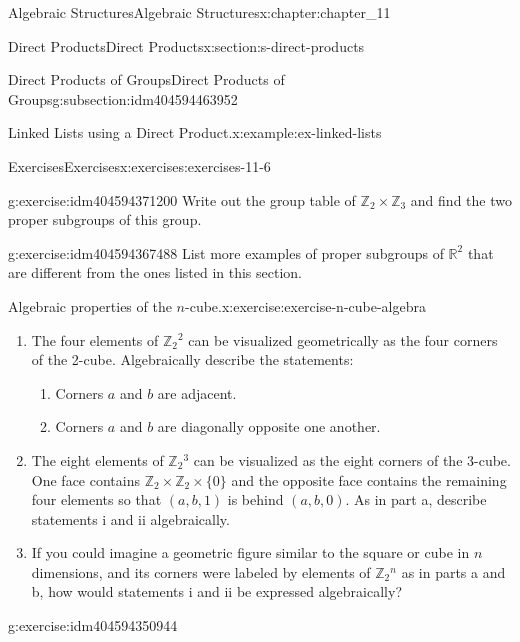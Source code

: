 \documentclass[twoside,10pt,]{book}
\numberwithin{equation}{section}
\begin{document}
\begin{chapterptx}{Algebraic Structures}{}{Algebraic Structures}{}{}{x:chapter:chapter_11}
\begin{sectionptx}{Direct Products}{}{Direct Products}{}{}{x:section:s-direct-products}
\begin{subsectionptx}{Direct Products of Groups}{}{Direct Products of Groups}{}{}{g:subsection:idm404594463952}
\begin{example}{Linked Lists using a Direct Product.}{x:example:ex-linked-lists}
\end{example}
\end{subsectionptx}
%
%
\typeout{************************************************}
\typeout{************************************************}
%
\begin{exercises-subsection}{Exercises}{}{Exercises}{}{}{x:exercises:exercises-11-6}
\begin{divisionexercise}{1}{}{}{g:exercise:idm404594371200}%
Write out the group table of \(\mathbb{Z}_2 \times  \mathbb{Z}_3\) and find the two proper subgroups of this group.%
\end{divisionexercise}%
\begin{divisionexercise}{2}{}{}{g:exercise:idm404594367488}%
List more examples of proper subgroups of \(\mathbb{R}^2\) that are different from the ones listed in this section.%
\end{divisionexercise}%
\begin{divisionexercise}{3}{Algebraic properties of the \(n\)-cube.}{}{x:exercise:exercise-n-cube-algebra}%
%
\begin{enumerate}[label=(\alph*)]
\item{}The four elements of \(\mathbb{Z}_2{}^2\) can be visualized geometrically as the four corners of the 2-cube.  Algebraically describe the statements:%
\begin{enumerate}[label=(\roman*)]
\item{}Corners \(a\) and \(b\) are adjacent.%
\item{}Corners \(a\) and \(b\) are diagonally opposite one another.%
\end{enumerate}
%
\item{}The eight elements of \(\mathbb{Z}_2{}^3\) can be visualized as the eight corners of the 3-cube. One face contains \(\mathbb{Z}_2 \times 
\mathbb{Z}_2\times \{0\}\) and the opposite face contains the remaining four elements so that \((a, b, 1)\) is behind \((a, b, 0)\). As in part a, describe statements i and ii algebraically.%
\item{}If you could imagine a geometric figure similar to the square or cube in \(n\) dimensions, and its corners were labeled by elements of \(\mathbb{Z}_2{}^n\) as in parts a and b, how would statements i and ii be expressed algebraically?%
\end{enumerate}
%
\end{divisionexercise}%
\begin{divisionexercise}{4}{}{}{g:exercise:idm404594350944}%
%
\begin{enumerate}[label=(\alph*)]

\end{enumerate}
\end{divisionexercise}
\end{exercises-subsection}
\end{sectionptx}
\end{chapterptx}
\end{document}
